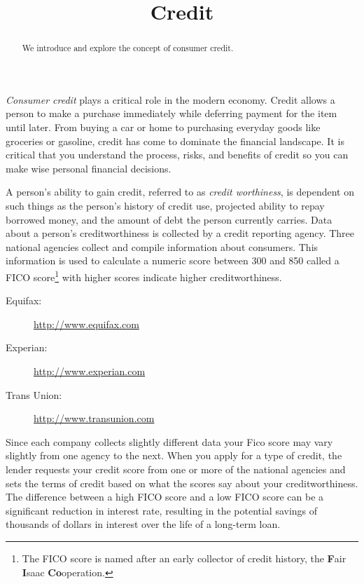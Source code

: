 \documentclass{ximera}
\title{Credit}
\begin{document}
\begin{abstract}
We introduce and explore the concept of consumer credit.
\end{abstract}

\maketitle

\emph{Consumer credit} plays a critical role in the modern economy. Credit allows a person to make a purchase immediately while deferring payment for the item until later. From buying a car or home to purchasing everyday goods like groceries or gasoline, credit has come to dominate the financial landscape. It is critical that you understand the process, risks, and benefits of credit so you can make wise personal financial decisions.

A person's ability to gain credit, referred to as \emph{credit worthiness}, is dependent on such things as the person's history of credit use, projected ability to repay borrowed money, and the amount of debt the person currently carries. Data about a person's creditworthiness is collected by a credit reporting agency. Three national agencies collect and compile information about consumers. This information is used to calculate a numeric score between 300 and 850 called a FICO score\footnote{The FICO score is named after an early collector of credit history, the \textbf{F}air \textbf{I}saac \textbf{Co}operation.} with higher scores indicate higher creditworthiness.
\begin{description}
\item[Equifax:] \href{http://www.equifax.com}{http://www.equifax.com}
\item[Experian:] \href{http://www.experian.com}{http://www.experian.com}
\item[Trans Union:] \href{http://www.transunion.com}{http://www.transunion.com}
\end{description}

Since each company collects slightly different data your Fico score may vary slightly from one agency to the next.  When you apply for a type of credit, the lender requests your credit score from one or more of the national agencies and sets the terms of credit based on what the scores say about your creditworthiness. The difference between a high FICO score and a low FICO score can be a significant reduction in interest rate, resulting in the potential savings of thousands of dollars in interest over the life of a long-term loan.
\end{document}
